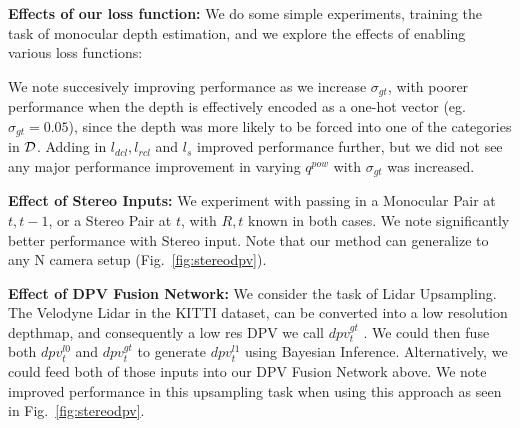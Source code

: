 \textbf{Effects of our loss function:} We do some simple experiments, training the task of monocular depth estimation, and we explore the effects of enabling various loss functions:
\noindent
\begin{table}[h]
  \centering
  \caption{Effects of Soft Cross Entropy ($\sigma_{gt}$), Left/Right Consistency ($l_{dcl}, l_{rcl}$), Smoothness losses ($l_{s}$) on Monocular Depth Estimation}
  \label{table:xx}
\end{table}

\vspace{-.1in}
We note succesively improving performance as we increase $\sigma_{gt}$, with poorer performance when the depth is effectively encoded as a one-hot vector (eg. $\sigma_{gt}=0.05$), since the depth was more likely to be forced into one of the categories in $\mathcal{D}$. Adding in $l_{dcl}, l_{rcl}$ and $l_{s}$ improved performance further, but we did not see any major performance improvement in varying $q^{pow}$ with $\sigma_{gt}$ was increased.

\textbf{Effect of Stereo Inputs:} We experiment with passing in a Monocular Pair at $t, t-1$, or a Stereo Pair at $t$, with $R,t$ known in both cases. We note significantly better performance with Stereo input. Note that our method can generalize to any N camera setup (Fig.~\ref{fig:stereodpv}).

\textbf{Effect of DPV Fusion Network:} We consider the task of Lidar Upsampling. The Velodyne Lidar in the KITTI dataset, can be converted into a low resolution depthmap, and consequently a low res DPV we call $dpv_{t}^{gt}$ . We could then fuse both $dpv_{t}^{l0}$ and $dpv_{t}^{gt}$ to generate $dpv_{t}^{l1}$ using Bayesian Inference. Alternatively, we could feed both of those inputs into our DPV Fusion Network above. We note improved performance in this upsampling task when using this approach as seen in Fig.~\ref{fig:stereodpv}. 

